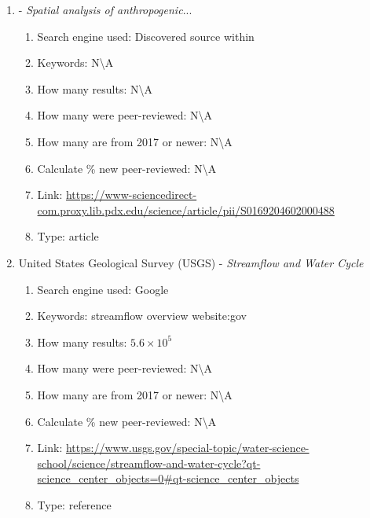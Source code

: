\documentclass[a4paper,man,biblatex]{apa7}
\begin{document}
\begin{enumerate}
        
    \item \textcite{stein_2002} - \textit{Spatial analysis of anthropogenic}...
        \begin{enumerate}
            \item Search engine used: Discovered source within \textcite{falcone_2016}
            \item Keywords: N\textbackslash A 
            \item How many results: N\textbackslash A
            \item How many were peer-reviewed: N\textbackslash A
            \item How many are from 2017 or newer: N\textbackslash A
            \item Calculate \% new peer-reviewed: N\textbackslash A
            \item Link: \url{https://www-sciencedirect-com.proxy.lib.pdx.edu/science/article/pii/S0169204602000488}
            \item Type: article 
        \end{enumerate}


    \item United States Geological Survey (USGS) - \textit{Streamflow and Water Cycle}
        \begin{enumerate}
            \item Search engine used: Google
            \item Keywords: streamflow overview website:gov 
            \item How many results: $5.6\times 10^5$
            \item How many were peer-reviewed: N\textbackslash A
            \item How many are from 2017 or newer: N\textbackslash A
            \item Calculate \% new peer-reviewed: N\textbackslash A 
            \item Link: \url{https://www.usgs.gov/special-topic/water-science-school/science/streamflow-and-water-cycle?qt-science_center_objects=0#qt-science_center_objects}
            \item Type: reference 
        \end{enumerate}



\end{enumerate}
\end{document}
